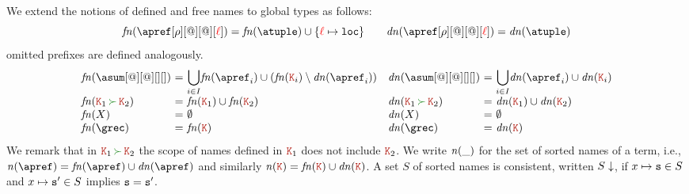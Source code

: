 We extend the notions of defined and free names to global types as
follows:
\[
 \fn{\apref[\arole][@][@][\alocvar]}
 = \fn \atuple \cup \{\alocvar \mapsto \asort[loc]\} 
\qquad
 \dn{\apref[\arole][@][@][\alocvar]} 
 = \dn \atuple 
\]
omitted prefixes are defined analogously.
\[
  \begin{array}{ll}
    \begin{array}{l@{\ =\ } ll}
      \fn{\asum[@][@][][]} & \displaystyle{\bigcup_{i\in I}} \fn{\apref_i} \cup (\fn{\aK_i}\setminus\dn{\apref_i})
      \\
      \fn{\aK_1 \seqop \aK_2} 
                &
                  \fn{\aK_1}\cup\fn{\aK_2}
      \\
      \fn X & \emptyset
      \\
      \fn \grec & \fn {\aK}
    \end{array}
    \begin{array}{l@{\ =\ } ll}
      \dn{\asum[@][@][][]} & \displaystyle{\bigcup_{i\in I}} \dn{\apref_i} \cup \dn{\aK_i}
      \\
      \dn{\aK_1 \seqop \aK_2} 
                           &
                             \dn{\aK_1}\cup\dn{\aK_2}
      \\
      \dn X & \emptyset
      \\
      \dn \grec & \dn {\aK}
    \end{array}
  \end{array}
\]
%
We remark that in $\aK_1 \seqop \aK_2$ the scope of names defined in $\aK_1$ does not include $\aK_2$.
We write ${\it n}(\_)$ for the set of sorted names of a term, i.e.,
$\names \apref = \fn\apref \cup \dn\apref$ and similarly
$\names \aK = \fn\aK \cup \dn\aK$. A set $S$ of sorted names is
consistent, written $S\downarrow$, if $x\mapsto \mathtt{s} \in S$ and
$x\mapsto \mathtt{s}' \in S$ implies $\mathtt{s} = \mathtt{s}'$.
 
